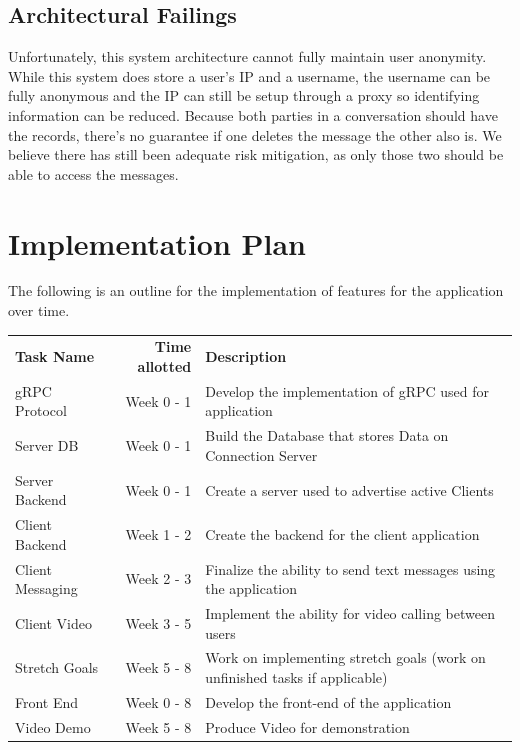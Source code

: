\documentclass[titlepage]{article}
\begin{document}
      \subsection{Architectural Failings}

      Unfortunately, this system architecture cannot fully maintain user anonymity.
      While this system does store a user's IP and a username, the username can be fully anonymous and the IP can still be setup through a proxy so identifying information can be reduced.
      Because both parties in a conversation should have the records, there's no guarantee if one deletes the message the other also is.
      We believe there has still been adequate risk mitigation, as only those two should be able to access the messages.

    \section{Implementation Plan}
    
    The following is an outline for the implementation of features for the application over time. \\

	\begin{tabular}{l r l}
		\textbf{Task Name}	& \textbf{Time allotted} & \textbf{Description}\\
		gRPC Protocol		& Week 0 - 1 & Develop the implementation of gRPC used for application\\
		Server DB  			& Week 0 - 1 & Build the Database that stores Data on Connection Server\\
		Server Backend 		& Week 0 - 1 & Create a server used to advertise active Clients\\
		Client Backend 		& Week 1 - 2 & Create the backend for the client application\\
		Client Messaging 	& Week 2 - 3 & Finalize the ability to send text messages using the application\\
		Client Video 		& Week 3 - 5 & Implement the ability for video calling between users\\
		Stretch Goals 		& Week 5 - 8 & Work on implementing stretch goals (work on unfinished tasks if applicable)\\
		Front End  			& Week 0 - 8 & Develop the front-end of the application\\
		Video Demo	 		& Week 5 - 8 & Produce Video for demonstration \\	
	\end{tabular}
\end{document}
